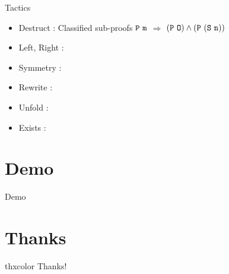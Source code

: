 \documentclass[UTF-8]{beamer}
\begin{document}
\begin{frame}{Tactics}
\begin{itemize}
\item Destruct : Classified sub-proofs \quad $\tt P\ m$ $\Rightarrow$ $\tt (P\ O)\wedge(P\ (S\ n))$
\item Left, Right :
\item Symmetry :
\item Rewrite :
\item Unfold :
\item Exists :
\end{itemize}
\end{frame}

\section{Demo}
\begin{frame}{Demo}
\end{frame}

\section*{Thanks}
\begin{frame}
\LARGE
\begin{beamercolorbox}[center,ht=3em]{thxcolor}
\vspace{1em}
\Huge Thanks!
\end{beamercolorbox}
\end{frame}
\end{document}
